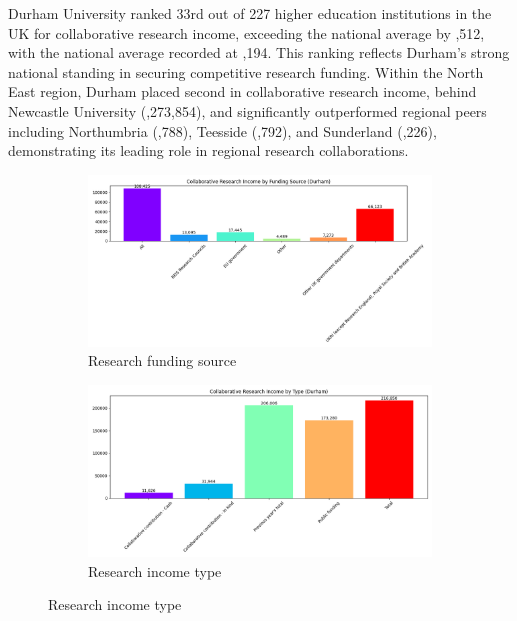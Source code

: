 \documentclass[journal,onecolumn, 10pt,draftclsnofoot]{IEEEtran}
\begin{document}
Durham University ranked 33rd out of 227 higher education institutions in the UK for collaborative research income, exceeding the national average by ,512, with the national average recorded at ,194. This ranking reflects Durham's strong national standing in securing competitive research funding. Within the North East region, Durham placed second in collaborative research income, behind Newcastle University (,273,854), and significantly outperformed regional peers including Northumbria (,788), Teesside (,792), and Sunderland (,226), demonstrating its leading role in regional research collaborations.

\begin{figure}[h]
\centering
\begin{subfigure}[b]{0.48\textwidth}
    \centering
    \includegraphics[width=\textwidth]{Fig/figure3.research_funding_source.png}
    \caption{Research funding source}
    \label{fig:research-funding}
\end{subfigure}
\hfill
\begin{subfigure}[b]{0.48\textwidth}
    \centering
    \includegraphics[width=\textwidth]{Fig/figure4.research_income_type.png}
    \caption{Research income type}

\end{subfigure}
\end{figure}
\end{document}
